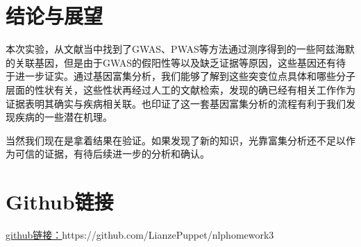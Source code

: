 \documentclass{article}
\begin{document}
\section{结论与展望}
本次实验，从文献当中找到了GWAS、PWAS等方法通过测序得到的一些阿兹海默的关联基因，但是由于GWAS的假阳性等以及缺乏证据等原因，这些基因还有待于进一步证实。通过基因富集分析，我们能够了解到这些突变位点具体和哪些分子层面的性状有关，这些性状再经过人工的文献检索，发现的确已经有相关工作作为证据表明其确实与疾病相关联。也印证了这一套基因富集分析的流程有利于我们发现疾病的一些潜在机理。\par
当然我们现在是拿着结果在验证。如果发现了新的知识，光靠富集分析还不足以作为可信的证据，有待后续进一步的分析和确认。
\section{Github链接}
\href{https://github.com/LianzePuppet/nlphomework3}{\underline{github链接：}}https://github.com/LianzePuppet/nlphomework3

\end{document}
